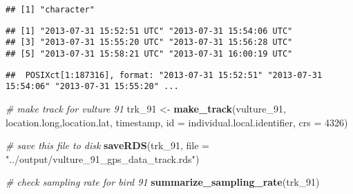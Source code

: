 \documentclass[
]{article}
\newenvironment{Shaded}{\begin{snugshade}}{\end{snugshade}}
\newcommand{\AttributeTok}[1]{\textcolor[rgb]{0.13,0.29,0.53}{#1}}
\newcommand{\CommentTok}[1]{\textcolor[rgb]{0.56,0.35,0.01}{\textit{#1}}}
\newcommand{\DecValTok}[1]{\textcolor[rgb]{0.00,0.00,0.81}{#1}}
\newcommand{\FunctionTok}[1]{\textcolor[rgb]{0.13,0.29,0.53}{\textbf{#1}}}
\newcommand{\NormalTok}[1]{#1}
\newcommand{\OtherTok}[1]{\textcolor[rgb]{0.56,0.35,0.01}{#1}}
\newcommand{\SpecialCharTok}[1]{\textcolor[rgb]{0.81,0.36,0.00}{\textbf{#1}}}
\newcommand{\StringTok}[1]{\textcolor[rgb]{0.31,0.60,0.02}{#1}}
\begin{document}
\begin{Shaded}
\end{Shaded}

\begin{verbatim}
## [1] "character"
\end{verbatim}

\begin{Shaded}
\end{Shaded}

\begin{verbatim}
## [1] "2013-07-31 15:52:51 UTC" "2013-07-31 15:54:06 UTC"
## [3] "2013-07-31 15:55:20 UTC" "2013-07-31 15:56:28 UTC"
## [5] "2013-07-31 15:58:21 UTC" "2013-07-31 16:00:19 UTC"
\end{verbatim}

\begin{Shaded}
\end{Shaded}

\begin{verbatim}
##  POSIXct[1:187316], format: "2013-07-31 15:52:51" "2013-07-31 15:54:06" "2013-07-31 15:55:20" ...
\end{verbatim}

\begin{Shaded}
\begin{Highlighting}[]
\CommentTok{\# make track for vulture 91}
\NormalTok{trk\_91 }\OtherTok{\textless{}{-}} \FunctionTok{make\_track}\NormalTok{(vulture\_91, location.long,location.lat, timestamp, }\AttributeTok{id =}\NormalTok{ individual.local.identifier, }\AttributeTok{crs =} \DecValTok{4326}\NormalTok{)}

\CommentTok{\# save this file to disk}
\FunctionTok{saveRDS}\NormalTok{(trk\_91, }\AttributeTok{file =} \StringTok{"../output/vulture\_91\_gps\_data\_track.rds"}\NormalTok{)}

\CommentTok{\# check sampling rate for bird 91}
\FunctionTok{summarize\_sampling\_rate}\NormalTok{(trk\_91)}
\end{Highlighting}
\end{Shaded}
\end{document}
